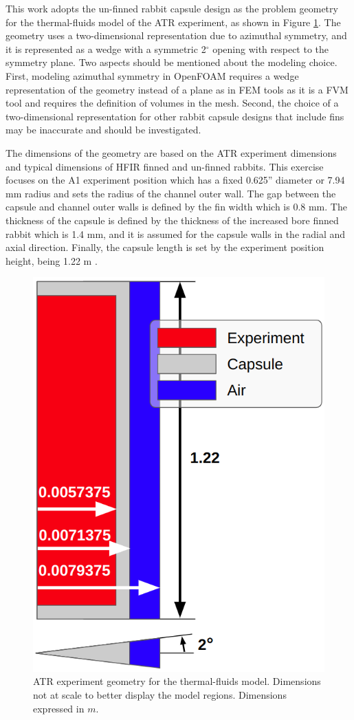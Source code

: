 This work adopts the un-finned rabbit capsule design as the problem geometry for the thermal-fluids model of the ATR experiment, as shown in Figure \ref{fig:atr-geo}.
The geometry uses a two-dimensional representation due to azimuthal symmetry, and it is represented as a wedge with a symmetric 2$^\circ$ opening with respect to the symmetry plane.
Two aspects should be mentioned about the modeling choice.
First, modeling azimuthal symmetry in OpenFOAM requires a wedge representation of the geometry instead of a plane as in \gls*{FEM} tools as it is a \gls*{FVM} tool and requires the definition of volumes in the mesh.
Second, the choice of a two-dimensional representation for other rabbit capsule designs that include fins may be inaccurate and should be investigated.

The dimensions of the geometry are based on the ATR experiment dimensions and typical dimensions of HFIR finned and un-finned rabbits.
This exercise focuses on the A1 experiment position which has a fixed 0.625'' diameter or 7.94 mm radius and sets the radius of the channel outer wall.
The gap between the capsule and channel outer walls is defined by the fin width which is 0.8 mm.
The thickness of the capsule is defined by the thickness of the increased bore finned rabbit which is 1.4 mm, and it is assumed for the capsule walls in the radial and axial direction.
Finally, the capsule length is set by the experiment position height, being 1.22 m \cite{inl_advanced_2009}.



\begin{figure}[htbp!] %
    \centering
    \includegraphics[width=0.45\linewidth]{figures/atr-geometry}
    \hfill
    \caption{ATR experiment geometry for the thermal-fluids model. Dimensions not at scale to better display the model regions. Dimensions expressed in $m$.}
    \label{fig:atr-geo}
\end{figure}

